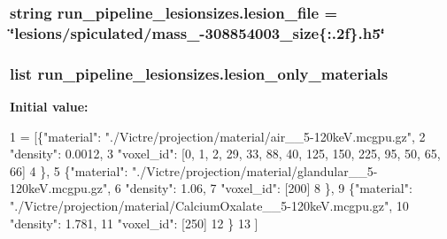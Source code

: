 \hypertarget{namespacerun__pipeline__lesionsizes_a6036549ef880af11d13c9e0c5d2c001a}{
\subsubsection[{lesion\-\_\-file}]{\setlength{\rightskip}{0pt plus 5cm}string run\-\_\-pipeline\-\_\-lesionsizes.\-lesion\-\_\-file = \char`\"{}lesions/spiculated/mass\-\_\--\/308854003\-\_\-size\{\-:.\-2f\}.\-h5\char`\"{}}}\label{namespacerun__pipeline__lesionsizes_a6036549ef880af11d13c9e0c5d2c001a}
\hypertarget{namespacerun__pipeline__lesionsizes_aba8698213c56a7ecc0806eb68c010d63}{
\subsubsection[{lesion\-\_\-only\-\_\-materials}]{\setlength{\rightskip}{0pt plus 5cm}list run\-\_\-pipeline\-\_\-lesionsizes.\-lesion\-\_\-only\-\_\-materials}}\label{namespacerun__pipeline__lesionsizes_aba8698213c56a7ecc0806eb68c010d63}
{\bfseries Initial value\-:}
\begin{DoxyCode}
1 = [\{\textcolor{stringliteral}{"material"}: \textcolor{stringliteral}{"./Victre/projection/material/air\_\_5-120keV.mcgpu.gz"},
2                           \textcolor{stringliteral}{"density"}: 0.0012,
3                           \textcolor{stringliteral}{"voxel\_id"}: [0, 1, 2, 29, 33, 88, 40, 125, 150, 225, 95, 50, 65, 66]
4                           \},
5                          \{\textcolor{stringliteral}{"material"}: \textcolor{stringliteral}{"./Victre/projection/material/glandular\_\_5-120keV.mcgpu.gz"},
6                           \textcolor{stringliteral}{"density"}: 1.06,
7                           \textcolor{stringliteral}{"voxel\_id"}: [200]
8                           \},
9                          \{\textcolor{stringliteral}{"material"}: \textcolor{stringliteral}{"./Victre/projection/material/CalciumOxalate\_\_5-120keV.mcgpu.gz"},
10                           \textcolor{stringliteral}{"density"}: 1.781,
11                           \textcolor{stringliteral}{"voxel\_id"}: [250]
12                           \}
13                          ]
\end{DoxyCode}
